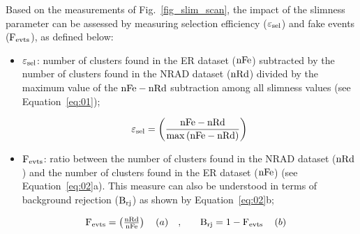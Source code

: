 \documentclass[a4paper,11pt]{article}
\begin{document}

Based on the measurements of Fig.~\ref{fig_slim_scan}, the impact of the slimness parameter can be assessed by measuring selection efficiency ($\rm \varepsilon_{sel}$) and fake events ($\rm F_{evts}$), as defined below:
\begin{itemize}
    \item $\rm \varepsilon_{sel}$: number of clusters found in the ER dataset ($\rm nFe$) subtracted by the number of clusters found in the NRAD dataset ($\rm nRd$) divided by the maximum value of the $\rm nFe-nRd$ subtraction among all slimness values (see Equation~\ref{eq:01});
    
    \begin{equation}
       {\rm \varepsilon_{sel} = \left( {\frac{{nFe - nRd}}{{\max \left( {nFe - nRd} \right)}}} \right)}
       \label{eq:01}
    \end{equation}

    
    \item $\rm F_{evts}$: ratio between the number of clusters found in the NRAD dataset ($\rm nRd$) and the number of clusters found in the ER dataset ($\rm  nFe$) (see Equation~\ref{eq:02}a). This measure can also be understood in terms of background rejection ($\rm B_{rj}$) as shown by Equation~\ref{eq:02}b;
    
    
\end{itemize}
\begin{equation}
    \begin{array}{*{20}{c}}
   \begin{array}{*{20}{c}}
   {\rm F_{evts} = \left( {\frac{{nRd}}{{nFe}}} \right)}  \\
\end{array} ~~(a) & {, ~~~} & {\rm B_{rj} = 1 - F_{evts} }  \\
\end{array} ~~(b)
\label{eq:02}
\end{equation}
\end{document}
